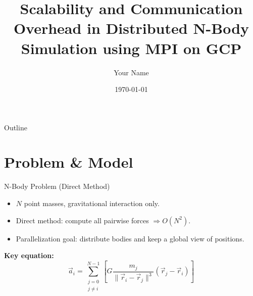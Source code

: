 \documentclass{beamer}
\title{Scalability and Communication Overhead in Distributed N-Body Simulation using MPI on GCP}
\author{Your Name}
\institute{Your Dept. / University}
\date{\today}
\begin{document}
\maketitle

\begin{frame}{Outline}
  \tableofcontents
\end{frame}

\section{Problem \& Model}
\begin{frame}{N-Body Problem (Direct Method)}
  \begin{itemize}
    \item $N$ point masses, gravitational interaction only.
    \item Direct method: compute all pairwise forces $\Rightarrow O(N^2)$.
    \item Parallelization goal: distribute bodies and keep a global view of positions.
  \end{itemize}
  \vspace{0.5em}
  \textbf{Key equation:}
  \[
    \vec{a}_i=\sum_{\substack{j=0 \\ j \neq i}}^{N-1}
    \left[G\frac{m_j}{\|\vec{r}_i-\vec{r}_j\|^3}(\vec{r}_j-\vec{r}_i)\right]
  \]
\end{frame}
\end{document}

